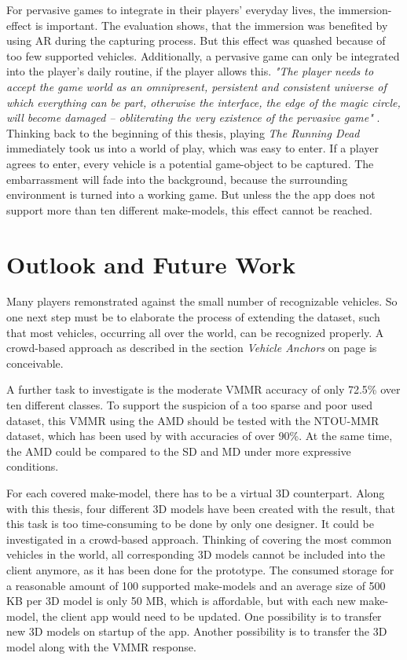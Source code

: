 For pervasive games to integrate in their players' everyday lives, the immersion-effect is important. The evaluation shows, that the immersion was benefited by using AR during the capturing process. But this effect was quashed because of too few supported vehicles. Additionally, a pervasive game can only be integrated into the player's daily routine, if the player allows this. \emph{"The player needs to accept the game world as an omnipresent, persistent and consistent universe of which everything can be part, otherwise the interface, the edge of the magic circle, will become damaged – obliterating the very existence of the pervasive game"} \citep{nieuwdorp2009pervasive}. Thinking back to the beginning of this thesis, playing \emph{The Running Dead} immediately took us into a world of play, which was easy to enter. If a player agrees to enter, every vehicle is a potential game-object to be captured. The embarrassment will fade into the background, because the surrounding environment is turned into a working game. But unless the the app does not support more than ten different make-models, this effect cannot be reached.

\section{Outlook and Future Work}
Many players remonstrated against the small number of recognizable vehicles. So one next step must be to elaborate the process of extending the dataset, such that most vehicles, occurring all over the world, can be recognized properly. A crowd-based approach as described in the section \emph{Vehicle Anchors} on page \pageref{par:vehicleAnchors} is conceivable.
 
A further task to investigate is the moderate VMMR accuracy of only 72.5\% over ten different classes. To support the suspicion of a too sparse and poor used dataset, this VMMR using the AMD should be tested with the NTOU-MMR dataset, which has been used by \citep{siddiqui2015robust} with accuracies of over 90\%. At the same time, the AMD could be compared to the SD and MD under more expressive conditions.
 
For each covered make-model, there has to be a virtual 3D counterpart. Along with this thesis, four different 3D models have been created with the result, that this task is too time-consuming to be done by only one designer. It could be investigated in a crowd-based approach. Thinking of covering the most common vehicles in the world, all corresponding 3D models cannot be included into the client anymore, as it has been done for the prototype. The consumed storage for a reasonable amount of 100 supported make-models and an average size of 500 KB per 3D model is only 50 MB, which is affordable, but with each new make-model, the client app would need to be updated. One possibility is to transfer new 3D models on startup of the app. Another possibility is to transfer the 3D model along with the VMMR response.
 
